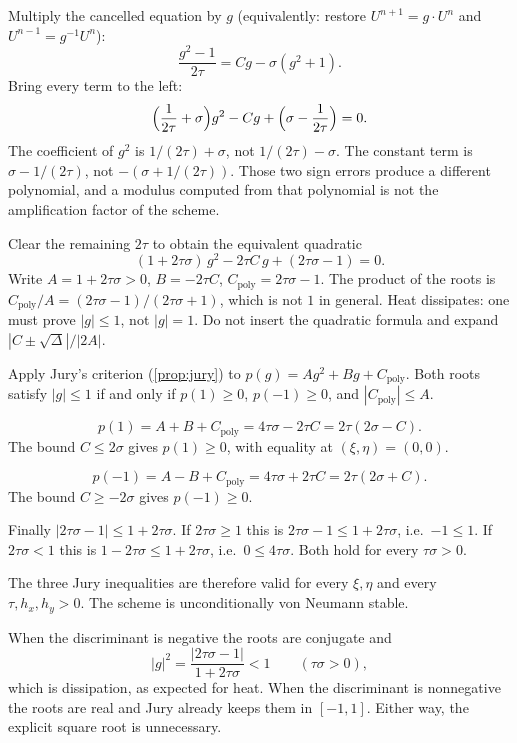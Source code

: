 Multiply the cancelled equation by \(g\) (equivalently: restore \(U^{n+1}=g\cdot U^n\) and \(U^{n-1}=g^{-1}U^n\)):
\[
\frac{g^2-1}{2\tau}
=
Cg-\sigma(g^2+1).
\]
Bring every term to the left:
\[
\Bigl(\frac{1}{2\tau}+\sigma\Bigr)g^2
-
C g
+
\Bigl(\sigma-\frac{1}{2\tau}\Bigr)
=
0.
\]
The coefficient of \(g^2\) is \(1/(2\tau)+\sigma\), not \(1/(2\tau)-\sigma\). The constant term is \(\sigma-1/(2\tau)\), not \(-(\sigma+1/(2\tau))\). Those two sign errors produce a different polynomial, and a modulus computed from that polynomial is not the amplification factor of the scheme.

Clear the remaining \(2\tau\) to obtain the equivalent quadratic
\[
(1+2\tau\sigma)\,g^2
-
2\tau C\,g
+
(2\tau\sigma-1)
=
0.
\]
Write \(A=1+2\tau\sigma>0\), \(B=-2\tau C\), \(C_{\mathrm{poly}}=2\tau\sigma-1\). The product of the roots is \(C_{\mathrm{poly}}/A=(2\tau\sigma-1)/(2\tau\sigma+1)\), which is not \(1\) in general. Heat dissipates: one must prove \(|g|\le 1\), not \(|g|=1\). Do not insert the quadratic formula and expand \(|C\pm\sqrt{\Delta}|/|2A|\).

Apply Jury's criterion (\cref{prop:jury}) to \(p(g)=Ag^2+Bg+C_{\mathrm{poly}}\). Both roots satisfy \(|g|\le 1\) if and only if \(p(1)\ge 0\), \(p(-1)\ge 0\), and \(|C_{\mathrm{poly}}|\le A\).

\[
p(1)
=
A+B+C_{\mathrm{poly}}
=
4\tau\sigma-2\tau C
=
2\tau(2\sigma-C).
\]
The bound \(C\le 2\sigma\) gives \(p(1)\ge 0\), with equality at \((\xi,\eta)=(0,0)\).

\[
p(-1)
=
A-B+C_{\mathrm{poly}}
=
4\tau\sigma+2\tau C
=
2\tau(2\sigma+C).
\]
The bound \(C\ge -2\sigma\) gives \(p(-1)\ge 0\).

Finally \(|2\tau\sigma-1|\le 1+2\tau\sigma\). If \(2\tau\sigma\ge 1\) this is \(2\tau\sigma-1\le 1+2\tau\sigma\), i.e.\ \(-1\le 1\). If \(2\tau\sigma<1\) this is \(1-2\tau\sigma\le 1+2\tau\sigma\), i.e.\ \(0\le 4\tau\sigma\). Both hold for every \(\tau\sigma>0\).

The three Jury inequalities are therefore valid for every \(\xi,\eta\) and every \(\tau,h_x,h_y>0\). The scheme is unconditionally von Neumann stable.

When the discriminant is negative the roots are conjugate and
\[
|g|^2
=
\frac{|2\tau\sigma-1|}{1+2\tau\sigma}
<1
\qquad(\tau\sigma>0),
\]
which is dissipation, as expected for heat. When the discriminant is nonnegative the roots are real and Jury already keeps them in \([-1,1]\). Either way, the explicit square root is unnecessary.

